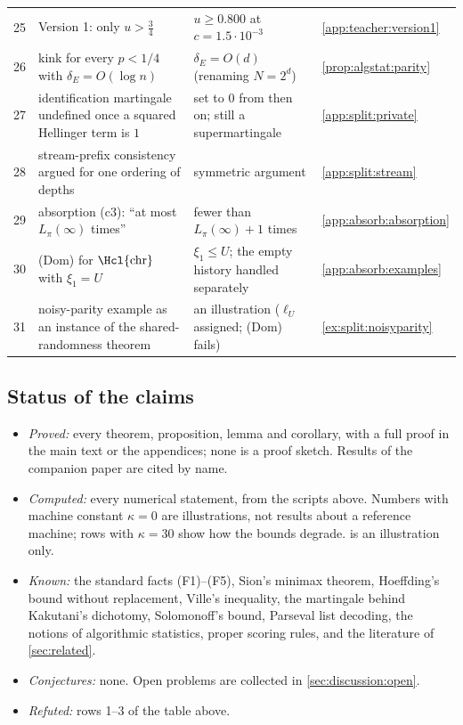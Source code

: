 \begin{longtable}{@{}r>{\raggedright\arraybackslash}p{5.5cm}>{\raggedright\arraybackslash}p{6.3cm}>{\raggedright\arraybackslash}p{2.6cm}@{}}
25 & Version 1: only $u>\frac34$ & $u\ge0.800$ at $c=1.5\cdot10^{-3}$ & \cref{app:teacher:version1}\\
26 & kink for every $p<1/4$ with $\delta_E=O(\log n)$ & $\delta_E=O(d)$ (renaming $N=2^d$) & \cref{prop:algstat:parity}\\
27 & identification martingale undefined once a squared Hellinger term is $1$ & set to $0$ from then on; still a supermartingale & \cref{app:split:private}\\
28 & stream-prefix consistency argued for one ordering of depths & symmetric argument & \cref{app:split:stream}\\
29 & absorption (c3): ``at most $L_\pi(\infty)$ times'' & fewer than $L_\pi(\infty)+1$ times & \cref{app:absorb:absorption}\\
30 & (Dom) for $\Hcl{\mathrm{chr}}$ with $\xi_1=U$ & $\xi_1\le U$; the empty history handled separately & \cref{app:absorb:examples}\\
31 & noisy-parity example as an instance of the shared-randomness theorem & an illustration ($\ell_U$ assigned; (Dom) fails) & \cref{ex:split:noisyparity}\\
\bottomrule
\end{longtable}
\endgroup

\subsection{Status of the claims}\label{app:verification:status}

\begin{itemize}
\item \emph{Proved:} every theorem, proposition, lemma and corollary, with a full proof in the main text or the appendices; none is a proof sketch. Results of the companion paper are cited by name.
\item \emph{Computed:} every numerical statement, from the scripts above. Numbers with machine constant $\kappa=0$ are illustrations, not results about a reference machine; rows with $\kappa=30$ show how the bounds degrade.  is an illustration only.
\item \emph{Known:} the standard facts (F1)--(F5), Sion's minimax theorem, Hoeffding's bound without replacement, Ville's inequality, the martingale behind Kakutani's dichotomy, Solomonoff's bound, Parseval list decoding, the notions of algorithmic statistics, proper scoring rules, and the literature of \cref{sec:related}.
\item \emph{Conjectures:} none. Open problems are collected in \cref{sec:discussion:open}.
\item \emph{Refuted:} rows 1--3 of the table above.
\end{itemize}

